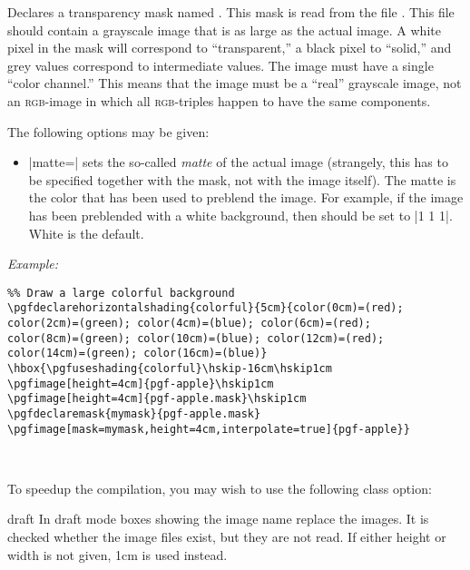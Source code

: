 \documentclass{ltxdoc}
\def\example{\par\smallskip\noindent\textit{Example: }}
\newcommand\opt[1]{{\color{black!50!green}#1}}
\renewcommand\oarg[1]{\opt{{\ttfamily[}\meta{#1}{\ttfamily]}}}
\begin{document}
\begin{command}{\pgfdeclaremask\oarg{options}}
  Declares a transparency mask named . This mask is
  read from the file . This file should contain a
  grayscale image that is as large as the actual image. A white
  pixel in the mask will correspond to ``transparent,'' a black pixel
  to ``solid,'' and grey values correspond to intermediate values. The
  image must have a single ``color channel.'' This means that the
  image must be a ``real'' grayscale image, not an \textsc{rgb}-image
  in which all \textsc{rgb}-triples happen to have the same
  components.

  The following options may be given:
  \begin{itemize}
  \item |matte=| sets the so-called
    \emph{matte} of the actual image (strangely, this has to be
    specified together with the mask, not with the image itself). The
    matte is the color that has been used to preblend the image. For
    example, if the image has been preblended with a white background,
    then  should be set to |{1 1 1}|. White is
    the default.
  \end{itemize}
  \example
\begin{verbatim}
%% Draw a large colorful background
\pgfdeclarehorizontalshading{colorful}{5cm}{color(0cm)=(red);
color(2cm)=(green); color(4cm)=(blue); color(6cm)=(red);
color(8cm)=(green); color(10cm)=(blue); color(12cm)=(red);
color(14cm)=(green); color(16cm)=(blue)}
\hbox{\pgfuseshading{colorful}\hskip-16cm\hskip1cm
\pgfimage[height=4cm]{pgf-apple}\hskip1cm
\pgfimage[height=4cm]{pgf-apple.mask}\hskip1cm
\pgfdeclaremask{mymask}{pgf-apple.mask}
\pgfimage[mask=mymask,height=4cm,interpolate=true]{pgf-apple}}
\end{verbatim}
\hbox{\hskip-16cm\hskip1cm
\hskip1cm
\hskip1cm
}
\end{command}


To speedup the compilation, you may wish to use the following class
option:
\begin{packageoption}{{draft}}
  In draft mode boxes showing the image name replace the
  images. It is checked whether the image files exist, but they are
  not read. If either height or width is not given, 1cm is used
  instead. 
\end{packageoption}
\end{document}
